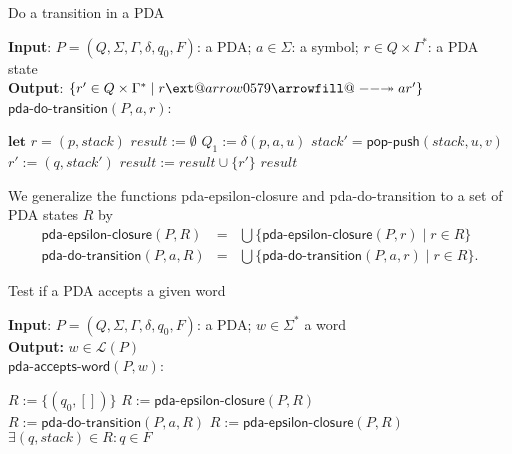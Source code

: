 \documentclass[11pt]{article}
\makeatletter
\newcommand*{\Language}[1]{\ensuremath{\mathcal{L}(#1)}}
\providecommand*{\twoheadrightarrowfill@}{%
  \arrowfill@\relbar\relbar\twoheadrightarrow
}
\providecommand*{\xtwoheadrightarrow}[2][]{%
  \ext@arrow 0579\twoheadrightarrowfill@{#1}{#2}%
}
\makeatother
\begin{document}
\begin{algorithm}
\small
\caption{Do a transition in a PDA}
\vspace*{1ex}
{\textbf{Input}:}
$P = (Q, \Sigma, \Gamma, \delta, q_0, F)$: a PDA; $a \in \Sigma$: a symbol; $r \in Q \times \Gamma^*$: a PDA state \\
{\textbf{Output}:}
$\{ r' \in Q \times \Gamma^* \mid r \xtwoheadrightarrow{a} r' \}$ \\

$\textsf{pda-do-transition}(P, a, r)$:
\begin{algorithmic}[1]
\State $\textbf{let } r = (p, stack)$
\State $result := \emptyset$
  \State $Q_1 := \delta(p, a, u)$
      \State $stack' = \textsf{pop-push}(stack, u, v)$
      \State $r' := (q, stack')$
      \State $result := result \cup \{ r' \}$
    \EndIf
  \EndFor
\EndFor
\State \Return $result$
\end{algorithmic}
\end{algorithm}

We generalize the functions \textsf{pda-epsilon-closure} and \textsf{pda-do-transition}  to a set of PDA states $R$ by
\[
\begin{array}{lll}
\textsf{pda-epsilon-closure}(P, R) & = & \bigcup \{ \textsf{pda-epsilon-closure}(P, r) \mid r \in R \} \\
\textsf{pda-do-transition}(P, a, R) & = & \bigcup \{ \textsf{pda-do-transition}(P, a, r) \mid r \in R \}.
\end{array}
\]

\begin{algorithm}
\small
\caption{Test if a PDA accepts a given word }
\vspace*{1ex}
{\textbf{Input}:} 
$P = (Q, \Sigma, \Gamma, \delta, q_0, F)$: a PDA; $w \in \Sigma^*$ a word \\
\textbf{Output:}
$w \in \Language{P}$ \\

$\textsf{pda-accepts-word}(P, w)$:
\begin{algorithmic}[1]
\State $R := \{ (q_0, []) \}$
\State $R := \textsf{pda-epsilon-closure}(P, R)$
  \State $R := \textsf{pda-do-transition}(P, a, R)$
  \State $R := \textsf{pda-epsilon-closure}(P, R)$
\EndFor
\State \Return $\exists (q, stack) \in R: q \in F$
\end{algorithmic}
\end{algorithm}
\end{document}
